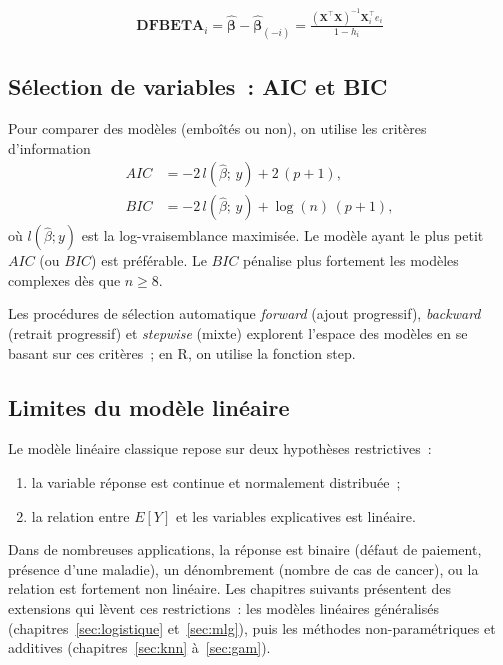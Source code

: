 \documentclass[11pt,letterpaper]{article}
\begin{document}
\begin{align*}
    \textbf{DFBETA}_i=\hat{\boldsymbol{\beta}}- \hat{\boldsymbol{\beta}}_{(-i)}=\frac{(\boldsymbol{X}^\top\boldsymbol{X})^{-1}\boldsymbol{X}_i^\top e_i}{1-h_i}
\end{align*}

\subsection{Sélection de variables~: AIC et BIC}

Pour comparer des modèles (emboîtés ou non), on utilise les critères d'information
\begin{align*}
AIC &= -2\, l(\hat\beta;\, y) + 2\,(p+1),\\
BIC &= -2\, l(\hat\beta;\, y) + \log(n)\,(p+1),
\end{align*}
où $l(\hat\beta; y)$ est la log-vraisemblance maximisée. Le modèle ayant le plus petit $AIC$ (ou $BIC$) est préférable. Le $BIC$ pénalise plus fortement les modèles complexes dès que $n \geq 8$.

Les procédures de sélection automatique \textit{forward} (ajout progressif), \textit{backward} (retrait progressif) et \textit{stepwise} (mixte) explorent l'espace des modèles en se basant sur ces critères~; en \textrm{R}, on utilise la fonction \textsf{step}.

\subsection{Limites du modèle linéaire}

Le modèle linéaire classique repose sur deux hypothèses restrictives~:
\begin{enumerate}
\item la variable réponse est continue et normalement distribuée~;
\item la relation entre $E[Y]$ et les variables explicatives est linéaire.
\end{enumerate}
Dans de nombreuses applications, la réponse est binaire (défaut de paiement, présence d'une maladie), un dénombrement (nombre de cas de cancer), ou la relation est fortement non linéaire. Les chapitres suivants présentent des extensions qui lèvent ces restrictions~: les modèles linéaires généralisés (chapitres~\ref{sec:logistique} et~\ref{sec:mlg}), puis les méthodes non-paramétriques et additives (chapitres~\ref{sec:knn} à~\ref{sec:gam}).

\newpage
\end{document}
